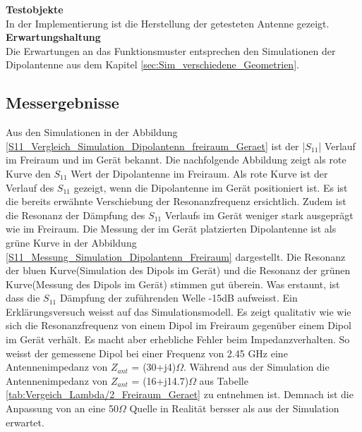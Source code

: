 \textbf{Testobjekte}\\
In der Implementierung ist die Herstellung der getesteten Antenne gezeigt.\\ 
\textbf{Erwartungshaltung}\\
Die Erwartungen an das Funktionsmuster entsprechen den Simulationen der Dipolantenne aus dem Kapitel \ref{sec:Sim_verschiedene_Geometrien}.\\

\subsection{Messergebnisse}
Aus den Simulationen in der Abbildung \ref{S11_Vergleich_Simulation_Dipolantenn_freiraum_Geraet} ist der |$S_{11}$| Verlauf im Freiraum und im Gerät bekannt. Die nachfolgende Abbildung zeigt als rote Kurve den $S_{11}$ Wert der Dipolantenne im Freiraum. Als rote Kurve ist der Verlauf des $S_{11}$ gezeigt, wenn die Dipolantenne im Gerät positioniert ist. Es ist die bereits erwähnte Verschiebung der Resonanzfrequenz ersichtlich. Zudem ist die Resonanz der Dämpfung des $S_{11}$ Verlaufs im Gerät weniger stark ausgeprägt wie im Freiraum. Die Messung der im Gerät platzierten Dipolantenne ist als grüne Kurve in der Abbildung \ref{S11_Messung_Simulation_Dipolantenn_Freiraum} dargestellt. Die Resonanz der bluen Kurve(Simulation des Dipols im Gerät) und die Resonanz der grünen Kurve(Messung des Dipols im Gerät) stimmen gut überein. Was erstaunt, ist dass die $S_{11}$ Dämpfung der zuführenden Welle -15dB aufweisst. Ein Erklärungsversuch weisst auf das Simulationsmodell. Es zeigt qualitativ wie wie sich die Resonanzfrequenz von einem Dipol im Freiraum gegenüber einem Dipol im Gerät verhält. Es macht aber erhebliche Fehler beim Impedanzverhalten. So weisst der gemessene Dipol bei einer Frequenz von 2.45 GHz eine Antennenimpedanz von $Z_{ant}$ = (30+j4)$\Omega$. Während aus der Simulation die Antennenimpedanz von $Z_{ant}$ = (16+j14.7)$\Omega$ aus Tabelle \ref{tab:Vergeich_Lambda/2_Freiraum_Geraet} zu entnehmen ist. Demnach ist die Anpassung von an eine 50$\Omega$ Quelle in Realität bersser als aus der Simulation erwartet.


%	

